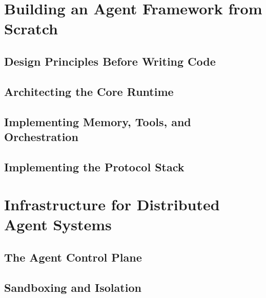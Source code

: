 \tableofcontents

\mainmatter

\part{Building an Agent Framework from Scratch}
\label{part:framework}

\chapter{Design Principles Before Writing Code}
\label{ch:design-principles-before-writing-code}


\chapter{Architecting the Core Runtime}
\label{ch:core-runtime}


\chapter{Implementing Memory, Tools, and Orchestration}
\label{ch:memory-tools-orchestration}


\chapter{Implementing the Protocol Stack}
\label{ch:protocol-stack}



\part{Infrastructure for Distributed Agent Systems}
\label{part:infrastructure}

\chapter{The Agent Control Plane}
\label{ch:control-plane}


\chapter{Sandboxing and Isolation}
\label{ch:sandboxing}


